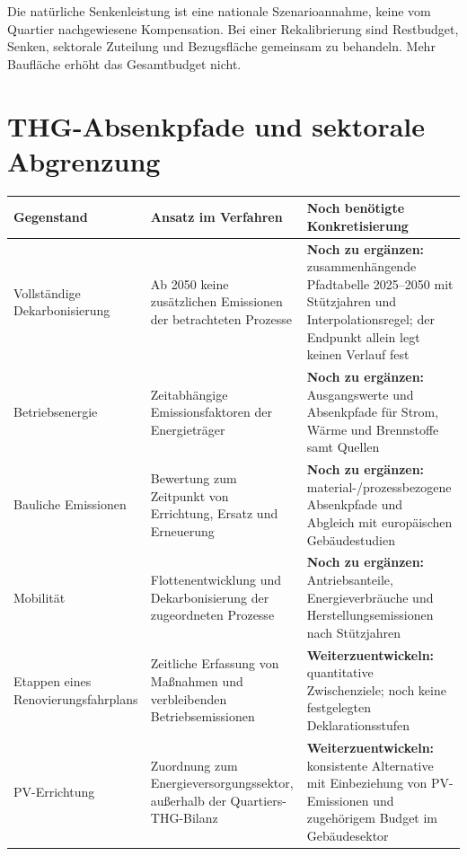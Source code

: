 \documentclass[
  ngerman,
  a4paper,
  DIV=11]{scrreprt}
\newcounter{none} %
\begin{document}
Die natürliche Senkenleistung ist eine nationale Szenarioannahme, keine
vom Quartier nachgewiesene Kompensation. Bei einer Rekalibrierung sind
Restbudget, Senken, sektorale Zuteilung und Bezugsfläche gemeinsam zu
behandeln. Mehr Baufläche erhöht das Gesamtbudget nicht.

\section{THG-Absenkpfade und sektorale
Abgrenzung}\label{thg-absenkpfade-und-sektorale-abgrenzung}

{\def\LTcaptype{none} %
\begin{longtable}[]{@{}
  >{\raggedright\arraybackslash}p{}
  >{\raggedright\arraybackslash}p{}
  >{\raggedright\arraybackslash}p{}@{}}
\toprule\noalign{}
\begin{minipage}[b]{\linewidth}\raggedright
Gegenstand
\end{minipage} & \begin{minipage}[b]{\linewidth}\raggedright
Ansatz im Verfahren
\end{minipage} & \begin{minipage}[b]{\linewidth}\raggedright
Noch benötigte Konkretisierung
\end{minipage} \\
\midrule\noalign{}
\endhead
\bottomrule\noalign{}
\endlastfoot
Vollständige Dekarbonisierung & Ab 2050 keine zusätzlichen Emissionen
der betrachteten Prozesse & \textbf{Noch zu ergänzen:} zusammenhängende
Pfadtabelle 2025--2050 mit Stützjahren und Interpolationsregel; der
Endpunkt allein legt keinen Verlauf fest \\
Betriebsenergie & Zeitabhängige Emissionsfaktoren der Energieträger &
\textbf{Noch zu ergänzen:} Ausgangswerte und Absenkpfade für Strom,
Wärme und Brennstoffe samt Quellen \\
Bauliche Emissionen & Bewertung zum Zeitpunkt von Errichtung, Ersatz und
Erneuerung & \textbf{Noch zu ergänzen:} material-/prozessbezogene
Absenkpfade und Abgleich mit europäischen Gebäudestudien \\
Mobilität & Flottenentwicklung und Dekarbonisierung der zugeordneten
Prozesse & \textbf{Noch zu ergänzen:} Antriebsanteile, Energieverbräuche
und Herstellungsemissionen nach Stützjahren \\
Etappen eines Renovierungsfahrplans & Zeitliche Erfassung von Maßnahmen
und verbleibenden Betriebsemissionen & \textbf{Weiterzuentwickeln:}
quantitative Zwischenziele; noch keine festgelegten
Deklarationsstufen \\
PV-Errichtung & Zuordnung zum Energieversorgungssektor, außerhalb der
Quartiers-THG-Bilanz & \textbf{Weiterzuentwickeln:} konsistente
Alternative mit Einbeziehung von PV-Emissionen und zugehörigem Budget im
Gebäudesektor \\
\end{longtable}
}
\end{document}
